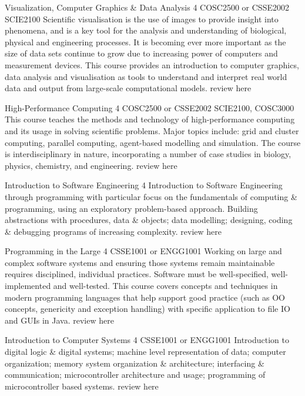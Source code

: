 	{Visualization, Computer Graphics \& Data Analysis}
	{4}
	{COSC2500 or CSSE2002}
	{SCIE2100}
	{}
	{Scientific visualisation is the use of images to provide insight into phenomena, and is a key tool for the analysis and understanding of biological, physical and engineering processes. It is becoming ever more important as the size of data sets continue to grow due to increasing power of computers and measurement devices. This course provides an introduction to computer graphics, data analysis and visualisation as tools to understand and interpret real world data and output from large-scale computational models.}
	{review here}

	{High-Performance Computing}
	{4}
	{COSC2500 or CSSE2002}
	{SCIE2100, COSC3000}
	{}
	{This course teaches the methods and technology of high-performance computing and its usage in solving scientific problems. Major topics include: grid and cluster computing, parallel computing, agent-based modelling and simulation. The course is interdisciplinary in nature, incorporating a number of case studies in biology, physics, chemistry, and engineering.}
	{review here}

	{Introduction to Software Engineering}
	{4}
	{}
	{}
	{}
	{Introduction to Software Engineering through programming with particular focus on the fundamentals of computing \& programming, using an exploratory problem-based approach. Building abstractions with procedures, data \& objects; data modelling; designing, coding \& debugging programs of increasing complexity.}
	{review here}

	{Programming in the Large}
	{4}
	{CSSE1001 or ENGG1001}
	{}
	{}
	{Working on large and complex software systems and ensuring those systems remain maintainable requires disciplined, individual practices. Software must be well-specified, well-implemented and well-tested. This course covers concepts and techniques in modern programming languages that help support good practice (such as OO concepts, genericity and exception handling) with specific application to file IO and GUIs in Java.}
	{review here}

	{Introduction to Computer Systems}
	{4}
	{CSSE1001 or ENGG1001}
	{}
	{}
	{Introduction to digital logic \& digital systems; machine level representation of data; computer organization; memory system organization \& architecture; interfacing \& communication; microcontroller architecture and usage; programming of microcontroller based systems.}
	{review here}


